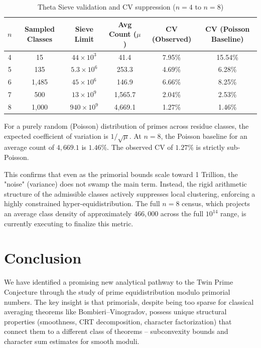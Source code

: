 \documentclass[11pt]{article}
\begin{document}
\begin{table}[h]
\centering
\caption{Theta Sieve validation and CV suppression ($n=4$ to $n=8$)}
\label{tab:theta_sieve}
\begin{tabular}{cccccc}
\toprule
$n$ & Sampled Classes & Sieve Limit & Avg Count ($\mu$) & CV (Observed) & CV (Poisson Baseline) \\
\midrule
4 & 15 & $44 \times 10^3$ & 41.4 & 7.95\% & 15.54\% \\
5 & 135 & $5.3 \times 10^6$ & 253.3 & 4.69\% & 6.28\% \\
6 & 1{,}485 & $45 \times 10^6$ & 146.9 & 6.66\% & 8.25\% \\
7 & 500 & $13 \times 10^9$ & 1{,}565.7 & 2.04\% & 2.53\% \\
8 & 1{,}000 & $940 \times 10^9$ & 4{,}669.1 & 1.27\% & 1.46\% \\
\bottomrule
\end{tabular}
\end{table}

\noindent For a purely random (Poisson) distribution of primes across residue classes, the expected coefficient of variation is $1/\sqrt{\mu}$. At $n=8$, the Poisson baseline for an average count of $4{,}669.1$ is $1.46\%$. The observed CV of $1.27\%$ is strictly sub-Poisson. 

This confirms that even as the primorial bounds scale toward 1 Trillion, the "noise" (variance) does not swamp the main term. Instead, the rigid arithmetic structure of the admissible classes actively suppresses local clustering, enforcing a highly constrained hyper-equidistribution. The full $n=8$ census, which projects an average class density of approximately $466{,}000$ across the full $10^{14}$ range, is currently executing to finalize this metric.

\section{Conclusion}

We have identified a promising new analytical pathway to the Twin Prime
Conjecture through the study of prime equidistribution modulo primorial
numbers. The key insight is that primorials, despite being too sparse
for classical averaging theorems like Bombieri--Vinogradov, possess
unique structural properties (smoothness, CRT decomposition, character
factorization) that connect them to a different class of theorems --
subconvexity bounds and character sum estimates for smooth moduli.
\end{document}

